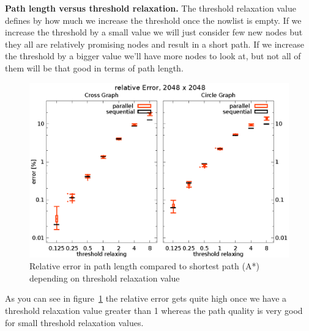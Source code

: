 \documentclass[letterpaper]{article}
\newcommand{\mypar}[1]{{\bf #1.}}
\begin{document}
\mypar{Path length versus threshold relaxation}
The threshold relaxation value defines by how much we increase the threshold once the nowlist is empty. If we increase the threshold by a small value we will just consider few new nodes but they all are relatively promising nodes and result in a short path. If we increase the threshold by a bigger value we'll have more nodes to look at, but not all of them will be that good in terms of path length.
\begin{figure}[h]\centering
  \includegraphics[scale=0.558]{error_threshold.eps}
  \caption{Relative error in path length compared to shortest path (A*) depending on threshold relaxation value\label{fig:error_thresh}}
\end{figure}
As you can see in figure~\ref{fig:error_thresh} the relative error gets quite high once we have a threshold relaxation value greater than 1 whereas the path quality is very good for small threshold relaxation values.
\end{document}
